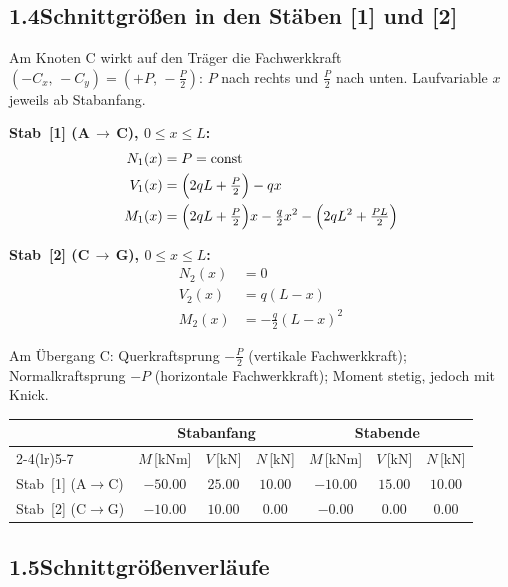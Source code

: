 \documentclass[a4paper,11pt]{article}
\begin{document}
\subsection*{1.4\quad Schnittgrößen in den Stäben [1] und [2]}

Am Knoten C wirkt auf den Träger die Fachwerkkraft
$(-C_x,\,-C_y) = (+P,\,-\tfrac{P}{2})$:
$P$ nach rechts und $\tfrac{P}{2}$ nach unten.
Laufvariable $x$ jeweils ab Stabanfang.

\textbf{Stab~[1] (A\,$\to$\,C), $0 \le x \le L$:}
\begin{align*}
  N_1(x) &= P = \text{const} \\
  V_1(x) &= \Bigl(2qL + \tfrac{P}{2}\Bigr) - qx \\
  M_1(x) &= \Bigl(2qL + \tfrac{P}{2}\Bigr)x - \tfrac{q}{2}x^2
            - \Bigl(2qL^2 + \tfrac{PL}{2}\Bigr)
\end{align*}

\textbf{Stab~[2] (C\,$\to$\,G), $0 \le x \le L$:}
\begin{align*}
  N_2(x) &= 0 \\
  V_2(x) &= q(L - x) \\
  M_2(x) &= -\tfrac{q}{2}(L - x)^2
\end{align*}

Am Übergang C: Querkraftsprung $-\tfrac{P}{2}$ (vertikale Fachwerkkraft);
Normalkraftsprung $-P$ (horizontale Fachwerkkraft); Moment stetig, jedoch mit Knick.

\medskip
\begin{center}
\begin{tabular}{l cccccc}
\toprule
 & \multicolumn{3}{c}{\textbf{Stabanfang}} & \multicolumn{3}{c}{\textbf{Stabende}} \\
\cmidrule(lr){2-4}\cmidrule(lr){5-7}
 & $M$\,[kNm] & $V$\,[kN] & $N$\,[kN]
 & $M$\,[kNm] & $V$\,[kN] & $N$\,[kN] \\
\midrule
Stab~[1] (A$\to$C) & $-50.00$ & $25.00$ & $10.00$ & $-10.00$ & $15.00$ & $10.00$ \\[3pt]
Stab~[2] (C$\to$G) & $-10.00$ & $10.00$ & $0.00$ & $-0.00$ & $0.00$ & $0.00$ \\
\bottomrule
\end{tabular}
\end{center}

\subsection*{1.5\quad Schnittgrößenverläufe}


\end{document}
